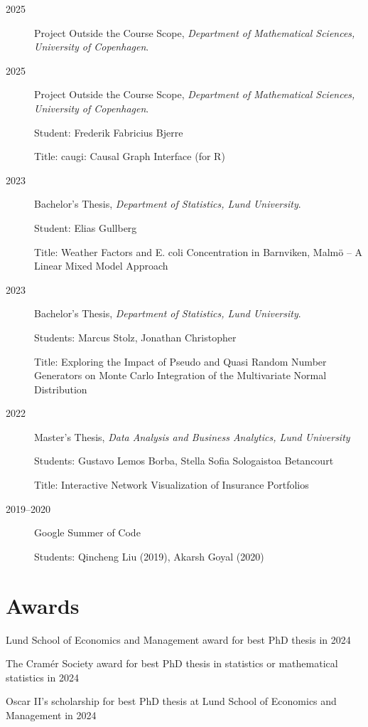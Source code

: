\documentclass[
  a4paper,
]{article}
\providecommand{\tightlist}{%
  \setlength{\itemsep}{0pt}\setlength{\parskip}{0pt}}
\begin{document}
\begin{description}
\item[2025]
Project Outside the Course Scope, \emph{Department of Mathematical
Sciences, University of Copenhagen}.
\item[2025]
Project Outside the Course Scope, \emph{Department of Mathematical
Sciences, University of Copenhagen}.

Student: Frederik Fabricius Bjerre

Title: caugi: Causal Graph Interface (for R)
\item[2023]
Bachelor's Thesis, \emph{Department of Statistics, Lund University}.

Student: Elias Gullberg

Title: Weather Factors and E. coli Concentration in Barnviken, Malmö --
A Linear Mixed Model Approach
\item[2023]
Bachelor's Thesis, \emph{Department of Statistics, Lund University}.

Students: Marcus Stolz, Jonathan Christopher

Title: Exploring the Impact of Pseudo and Quasi Random Number Generators
on Monte Carlo Integration of the Multivariate Normal Distribution
\item[2022]
Master's Thesis, \emph{Data Analysis and Business Analytics, Lund
University}

Students: Gustavo Lemos Borba, Stella Sofia Sologaistoa Betancourt

Title: Interactive Network Visualization of Insurance Portfolios
\item[2019--2020]
Google Summer of Code

Students: Qincheng Liu (2019), Akarsh Goyal (2020)
\end{description}

\section{Awards}\label{awards}

\begin{description}
\tightlist
\item[2025]
Lund School of Economics and Management award for best PhD thesis in
2024

The Cramér Society award for best PhD thesis in statistics or
mathematical statistics in 2024

Oscar II's scholarship for best PhD thesis at Lund School of Economics
and Management in 2024
\end{description}
\end{document}
